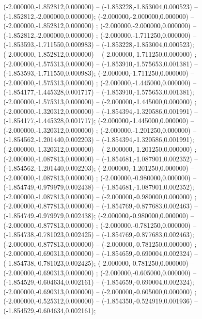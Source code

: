  (-2.000000,-1.852812,0.000000) -- (-1.853228,-1.853004,0.000523) -- (-1.852812,-2.000000,0.000000);
 (-2.000000,-2.000000,0.000000) -- (-2.000000,-1.852812,0.000000) ;
 (-2.000000,-2.000000,0.000000) -- (-1.852812,-2.000000,0.000000) ;
 (-2.000000,-1.711250,0.000000) -- (-1.853593,-1.711550,0.000983) -- (-1.853228,-1.853004,0.000523);
 (-2.000000,-1.852812,0.000000) -- (-2.000000,-1.711250,0.000000) ;
 (-2.000000,-1.575313,0.000000) -- (-1.853910,-1.575653,0.001381) -- (-1.853593,-1.711550,0.000983);
 (-2.000000,-1.711250,0.000000) -- (-2.000000,-1.575313,0.000000) ;
 (-2.000000,-1.445000,0.000000) -- (-1.854177,-1.445328,0.001717) -- (-1.853910,-1.575653,0.001381);
 (-2.000000,-1.575313,0.000000) -- (-2.000000,-1.445000,0.000000) ;
 (-2.000000,-1.320312,0.000000) -- (-1.854394,-1.320586,0.001991) -- (-1.854177,-1.445328,0.001717);
 (-2.000000,-1.445000,0.000000) -- (-2.000000,-1.320312,0.000000) ;
 (-2.000000,-1.201250,0.000000) -- (-1.854562,-1.201440,0.002203) -- (-1.854394,-1.320586,0.001991);
 (-2.000000,-1.320312,0.000000) -- (-2.000000,-1.201250,0.000000) ;
 (-2.000000,-1.087813,0.000000) -- (-1.854681,-1.087901,0.002352) -- (-1.854562,-1.201440,0.002203);
 (-2.000000,-1.201250,0.000000) -- (-2.000000,-1.087813,0.000000) ;
 (-2.000000,-0.980000,0.000000) -- (-1.854749,-0.979979,0.002438) -- (-1.854681,-1.087901,0.002352);
 (-2.000000,-1.087813,0.000000) -- (-2.000000,-0.980000,0.000000) ;
 (-2.000000,-0.877813,0.000000) -- (-1.854769,-0.877683,0.002463) -- (-1.854749,-0.979979,0.002438);
 (-2.000000,-0.980000,0.000000) -- (-2.000000,-0.877813,0.000000) ;
 (-2.000000,-0.781250,0.000000) -- (-1.854738,-0.781023,0.002425) -- (-1.854769,-0.877683,0.002463);
 (-2.000000,-0.877813,0.000000) -- (-2.000000,-0.781250,0.000000) ;
 (-2.000000,-0.690313,0.000000) -- (-1.854659,-0.690004,0.002324) -- (-1.854738,-0.781023,0.002425);
 (-2.000000,-0.781250,0.000000) -- (-2.000000,-0.690313,0.000000) ;
 (-2.000000,-0.605000,0.000000) -- (-1.854529,-0.604634,0.002161) -- (-1.854659,-0.690004,0.002324);
 (-2.000000,-0.690313,0.000000) -- (-2.000000,-0.605000,0.000000) ;
 (-2.000000,-0.525312,0.000000) -- (-1.854350,-0.524919,0.001936) -- (-1.854529,-0.604634,0.002161);
